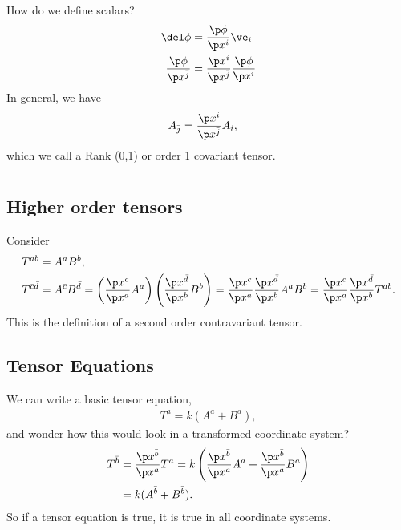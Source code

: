 \documentclass[a4paper, 11pt, normalem]{report}
\begin{document}
How do we define scalars? 
\begin{align}
    \del\phi &= \frac{\p\phi}{\p x^i}\ve_i \\
    \frac{\p\phi}{\p x^{\bar{j}}} &= \frac{\p x^i}{\p x^{\bar{j}}}\frac{\p\phi}{\p x^i}
\end{align}
In general, we have
\begin{align}
    A_{\bar{j}} &= \frac{\p x^i}{\p x^{\bar{j}}}A_i,
\end{align}
which we call a Rank (0,1) or order 1 covariant tensor.

\chapter{}

\section{Higher order tensors}
Consider
\begin{align}
    T^{ab} &= A^aB^b, \\
    T^{\bar{c}\bar{d}} &= A^{\bar{c}}B^{\bar{d}} = \left(\frac{\p x^{\bar{c}}}{\p x^a}A^a\right)\left(\frac{\p x^{\bar{d}}}{\p x^b}B^b\right) = \frac{\p x^{\bar{c}}}{\p x^a}\frac{\p x^{\bar{d}}}{\p x^b}A^a B^b = \frac{\p x^{\bar{c}}}{\p x^a}\frac{\p x^{\bar{d}}}{\p x^b}T^{ab}.
\end{align}
This is the definition of a second order contravariant tensor. 

\section{Tensor Equations}
We can write a basic tensor equation,
\begin{align}
    T^a = k(A^a+B^a),
\end{align}
and wonder how this would look in a transformed coordinate system?
\begin{align}
    T^{\bar{b}} &= \frac{\p x^{\bar{b}}}{\p x^a}T^a = k\left(\frac{\p x^{\bar{b}}}{\p x^a}A^a + \frac{\p x^{\bar{b}}}{\p x^a}B^a\right) \\
                &= k(A^{\bar{b}}+B^{\bar{b}}).
\end{align}
So if a tensor equation is true, it is true in all coordinate systems.
\end{document}
